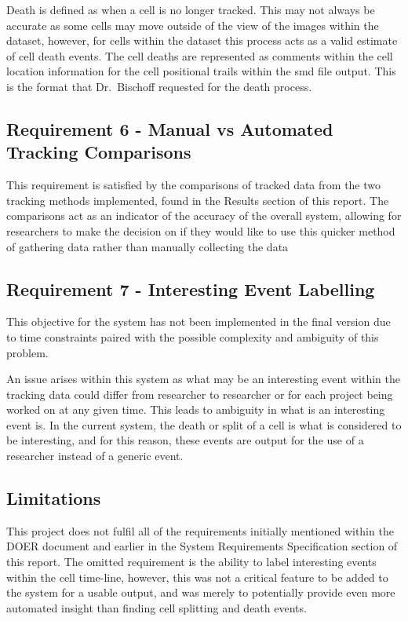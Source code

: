 \documentclass[12pt a4paper]{article}
\begin{document}
Death is defined as when a cell is no longer tracked. This may not always be accurate as some cells may move outside of the view of the images within the dataset, however, for cells within the dataset this process acts as a valid estimate of cell death events. The cell deaths are represented as comments within the cell location information for the cell positional trails within the smd file output. This is the format that Dr.~Bischoff requested for the death process.

\subsection{Requirement 6 - Manual vs Automated Tracking Comparisons}
This requirement is satisfied by the comparisons of tracked data from the two tracking methods implemented, found in the Results section of this report. 
The comparisons act as an indicator of the accuracy of the overall system, allowing for researchers to make the decision on if they would like to use this quicker method of gathering data rather than manually collecting the data


\subsection{Requirement 7 - Interesting Event Labelling}
This objective for the system has not been implemented in the final version due to time constraints paired with the possible complexity and ambiguity of this problem.

An issue arises within this system as what may be an interesting event within the tracking data could differ from researcher to researcher or for each project being worked on at any given time. This leads to ambiguity in what is an interesting event is.
In the current system, the death or split of a cell is what is considered to be interesting, and for this reason, these events are output for the use of a researcher instead of a generic event.
\subsection{Limitations}
This project does not fulfil all of the requirements initially mentioned within the DOER document and earlier in the System Requirements Specification section of this report. The omitted requirement is the ability to label interesting events within the cell time-line, however, this was not a critical feature to be added to the system for a usable output, and was merely to potentially provide even more automated insight than finding cell splitting and death events.
\end{document}
